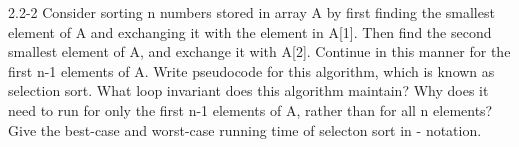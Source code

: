 2.2-2
Consider sorting n numbers stored in array A by first finding the smallest element of A and exchanging it with the element in A[1]. Then find the second  smallest element of A, and exchange it with A[2]. Continue in this manner for the first n-1 elements of A. Write pseudocode for this algorithm, which is known as selection sort. What loop invariant does this algorithm maintain? Why does it need  to run for only the first n-1 elements of A, rather than for all n elements? Give the best-case and worst-case running time of selecton sort in \Theta - notation.
